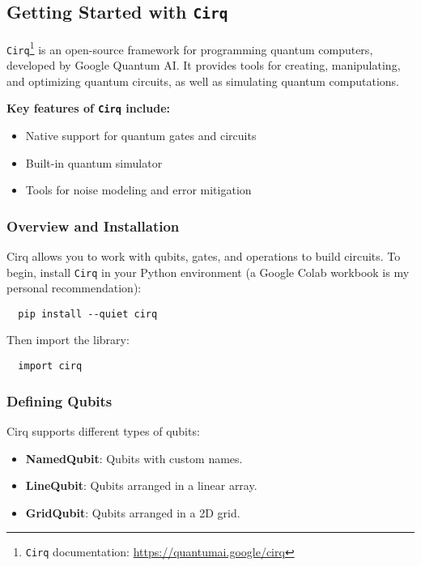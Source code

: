 \subsection*{Getting Started with \texttt{Cirq}}

\texttt{Cirq}\footnote{\texttt{Cirq} documentation:
\url{https://quantumai.google/cirq}} is an open-source framework for
programming quantum computers, developed by Google Quantum AI. It provides
tools for creating, manipulating, and optimizing quantum circuits, as well as
simulating quantum computations.

\vspace{0.3cm}

\noindent
\textbf{
  Key features of \texttt{Cirq} include:
}

\begin{itemize}
  \item Native support for quantum gates and circuits
  \item Built-in quantum simulator
  \item Tools for noise modeling and error mitigation
\end{itemize}

\subsubsection*{Overview and Installation}
Cirq allows you to work with qubits, gates, and operations to build circuits.
To begin, install \texttt{Cirq} in your Python environment (a Google Colab
workbook is my personal recommendation):

\begin{verbatim}
  pip install --quiet cirq
\end{verbatim}

Then import the library:

\begin{verbatim}
  import cirq
\end{verbatim}

\subsubsection*{Defining Qubits}
Cirq supports different types of qubits:
\begin{itemize}

  \item \textbf{NamedQubit}: Qubits with custom names.

  \item \textbf{LineQubit}: Qubits arranged in a linear array.

  \item \textbf{GridQubit}: Qubits arranged in a 2D grid.
\end{itemize}

